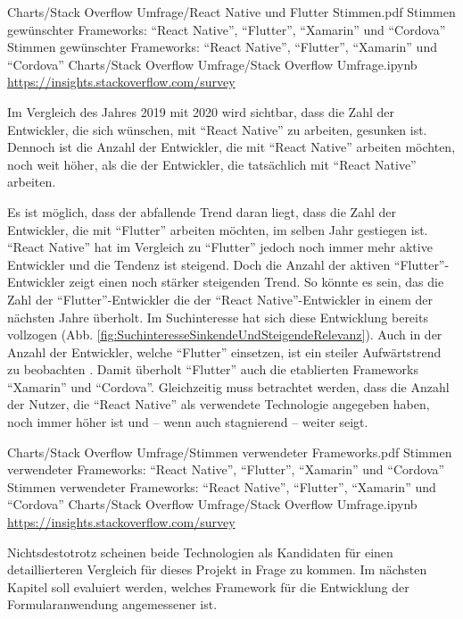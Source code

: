 \begin{alexfigurewithnotebook}{Charts/Stack Overflow Umfrage/React Native und Flutter Stimmen.pdf}
	{Stimmen gewünschter Frameworks: \enquote{React Native}, \enquote{Flutter}, \enquote{Xamarin} und \enquote{Cordova}}
	{Stimmen gewünschter Frameworks: \enquote{React Native}, \enquote{Flutter}, \enquote{Xamarin} und \enquote{Cordova}}
	{Charts/Stack Overflow Umfrage/Stack Overflow Umfrage.ipynb}
	{\url{https://insights.stackoverflow.com/survey}}
	\label{fig:ReactNativeUndFlutterStimmen}

\end{alexfigurewithnotebook}

Im Vergleich des Jahres 2019 mit 2020 wird sichtbar, dass die Zahl der Entwickler, die sich wünschen, mit \enquote{React Native} zu arbeiten, gesunken ist.
Dennoch ist die Anzahl der Entwickler, die mit \enquote{React Native} arbeiten möchten, noch weit höher, als die der Entwickler, die tatsächlich mit \enquote{React Native} arbeiten.

Es ist möglich, dass der abfallende Trend daran liegt, dass die Zahl der Entwickler, die mit \enquote{Flutter} arbeiten möchten, im selben Jahr gestiegen ist.
\enquote{React Native} hat im Vergleich zu \enquote{Flutter} jedoch noch immer mehr aktive Entwickler und die Tendenz ist steigend.
Doch die Anzahl der aktiven \enquote{Flutter}-Entwickler zeigt einen noch stärker steigenden Trend.
So könnte es sein, das die Zahl der \enquote{Flutter}-Entwickler die der \enquote{React Native}-Entwickler in einem der nächsten Jahre überholt.
Im Suchinteresse hat sich diese Entwicklung bereits vollzogen (Abb. \ref{fig:SuchinteresseSinkendeUndSteigendeRelevanz}).
Auch in der Anzahl der Entwickler, welche \enquote{Flutter} einsetzen, ist ein steiler Aufwärtstrend zu beobachten \Abb{\ref{fig:StimmenVerwendeterFrameworks}}.
Damit überholt \enquote{Flutter} auch die etablierten Frameworks \enquote{Xamarin} und \enquote{Cordova}.
Gleichzeitig muss betrachtet werden,
dass die Anzahl der Nutzer,
die \enquote{React Native} als verwendete Technologie angegeben haben,
noch immer höher ist und -- wenn auch stagnierend -- weiter seigt. 

\begin{alexfigurewithnotebook}{Charts/Stack Overflow Umfrage/Stimmen verwendeter Frameworks.pdf}
	{Stimmen verwendeter Frameworks: \enquote{React Native}, \enquote{Flutter}, \enquote{Xamarin} und \enquote{Cordova}}
	{Stimmen verwendeter Frameworks: \enquote{React Native}, \enquote{Flutter}, \enquote{Xamarin} und \enquote{Cordova}}
	{Charts/Stack Overflow Umfrage/Stack Overflow Umfrage.ipynb}
	{\url{https://insights.stackoverflow.com/survey}}
	\label{fig:StimmenVerwendeterFrameworks}
\end{alexfigurewithnotebook}

Nichtsdestotrotz scheinen beide Technologien als Kandidaten für einen detaillierteren Vergleich für dieses Projekt in Frage zu kommen.
Im nächsten Kapitel soll evaluiert werden, welches Framework für die Entwicklung der Formularanwendung angemessener ist.